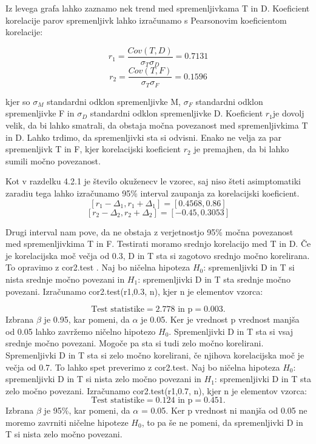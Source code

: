 \documentclass[a4paper,11pt]{article}
\begin{document}
Iz levega grafa lahko zaznamo nek trend med spremenljivkama T in D. Koeficient korelacije parov spremenljivk lahko izračunamo s Pearsonovim koeficientom korelacije:

\[r_1 = \frac{Cov(T,D)}{\sigma_{T} \sigma_{D}} = 0.7131\]
\[r_2 = \frac{Cov(T,F)}{\sigma_{T} \sigma_{F}} = 0.1596\]

kjer so \(\sigma_{M}\) standardni odklon spremenljivke M, \(\sigma_{F}\) standardni odklon spremenljivke F in \(\sigma_{D}\) standardni odklon spremenljivke D. Koeficient \(r_1\)je dovolj velik, da bi lahko smatrali, da obstaja močna povezanost med spremenljivkima T in D. Lahko trdimo, da spremenljivki sta si odvisni. Enako ne velja za par spremenljivk T in F, kjer korelacijski koeficient \(r_2\) je premajhen, da bi lahko sumili močno povezanost.

Kot v razdelku 4.2.1 je število okuženecv le vzorec, saj niso šteti asimptomatiki zaradiu tega lahko izračunamo 95\% interval zaupanja za korelacijski koeficient. 
\[[r_1 - \Delta_1, r_1 + \Delta_1] = [0.4568, 0.86]\]
\[[r_2 - \Delta_2, r_2 + \Delta_2] = [-0.45, 0.3053]\]

Drugi interval nam pove, da ne obstaja z verjetnostjo 95\% močna povezanost med spremenljivkima T in F. Testirati moramo srednjo korelacijo med T in D. Če je korelacijska moč večja od 0.3, D in T sta si zagotovo srednjo močno korelirana. To opravimo z cor2.test \cite{github}. Naj bo ničelna hipoteza \(H_0\): spremenljivki D in T si nista srednje močno povezani in \(H_1\): spremenljivki D in T sta srednje močno povezani. Izračunamo cor2.test(r1,0.3, n), kjer n je elementov vzorca:

\[\text{Test statistike} = 2.778 \text{ in p} =  0.003.\]
Izbrana \(\beta\) je 0.95, kar pomeni, da \(\alpha\) je 0.05. Ker je vrednost p vrednost manjša od 0.05 lahko zavržemo ničelno hipotezo \(H_0\). Spremenljivki D in T sta si vsaj srednje močno povezani. Mogoče pa sta si tudi zelo močno korelirani. Spremenljivki D in T sta si zelo močno korelirani, če njihova korelacijska moč je večja od 0.7. To lahko spet preverimo z cor2.test. Naj bo ničelna hipoteza \(H_0\): spremenljivki D in T si nista zelo močno povezani in \(H_1\): spremenljivki D in T sta zelo močno povezani. Izračunamo cor2.test(r1,0.7, n), kjer n je elementov vzorca:
\[\text{Test statistike} = 0.124 \text{ in p} = 0.451.\]
Izbrana \(\beta\) je 95\%, kar pomeni, da \(\alpha\) = 0.05. Ker p vrednost ni manjša od 0.05 ne moremo zavrniti ničelne hipoteze \(H_0\), to pa še ne pomeni, da spremenljivki D in T si nista zelo močno povezani.
\end{document}
